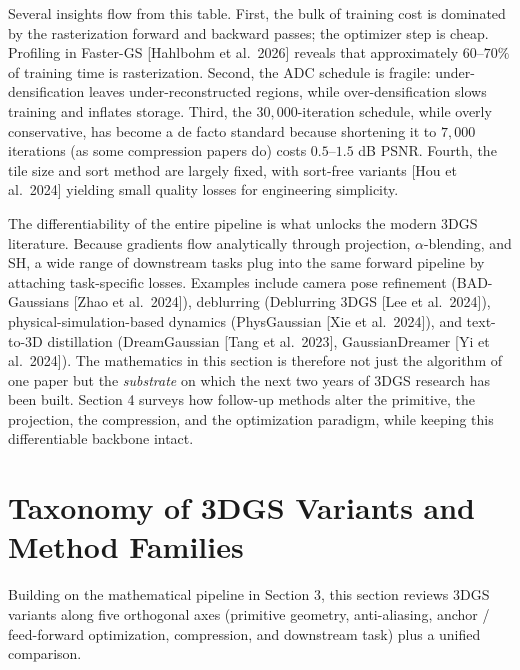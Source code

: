 Several insights flow from this table. First, the bulk of training cost is dominated by the rasterization forward and backward passes; the optimizer step is cheap. Profiling in Faster-GS {[}Hahlbohm et al.~2026{]} reveals that approximately \(60\)--\(70\%\) of training time is rasterization. Second, the ADC schedule is fragile: under-densification leaves under-reconstructed regions, while over-densification slows training and inflates storage. Third, the \(30{,}000\)-iteration schedule, while overly conservative, has become a de facto standard because shortening it to \(7{,}000\) iterations (as some compression papers do) costs \(0.5\)--\(1.5\) dB PSNR. Fourth, the tile size and sort method are largely fixed, with sort-free variants {[}Hou et al.~2024{]} yielding small quality losses for engineering simplicity.

The differentiability of the entire pipeline is what unlocks the modern 3DGS literature. Because gradients flow analytically through projection, \(\alpha\)-blending, and SH, a wide range of downstream tasks plug into the same forward pipeline by attaching task-specific losses. Examples include camera pose refinement (BAD-Gaussians {[}Zhao et al.~2024{]}), deblurring (Deblurring 3DGS {[}Lee et al.~2024{]}), physical-simulation-based dynamics (PhysGaussian {[}Xie et al.~2024{]}), and text-to-3D distillation (DreamGaussian {[}Tang et al.~2023{]}, GaussianDreamer {[}Yi et al.~2024{]}). The mathematics in this section is therefore not just the algorithm of one paper but the \emph{substrate} on which the next two years of 3DGS research has been built. Section 4 surveys how follow-up methods alter the primitive, the projection, the compression, and the optimization paradigm, while keeping this differentiable backbone intact.

\section{Taxonomy of 3DGS Variants and Method Families}\label{taxonomy-of-3dgs-variants-and-method-families}

Building on the mathematical pipeline in Section 3, this section reviews 3DGS variants along five orthogonal axes (primitive geometry, anti-aliasing, anchor / feed-forward optimization, compression, and downstream task) plus a unified comparison.

